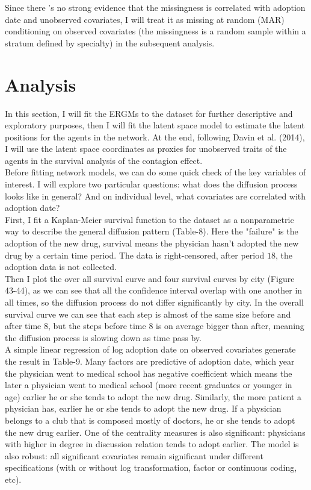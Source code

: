 \documentclass[11pt]{article}
\begin{document}
Since there 's no strong evidence that the missingness is correlated with adoption date and unobserved covariates, I will treat it as missing at random (MAR) conditioning on observed covariates (the missingness is a random sample within a stratum defined by specialty) in the subsequent analysis.\\


\section{Analysis}
In this section, I will fit the ERGMs to the dataset for further descriptive and exploratory purposes, then I will fit the latent space model to estimate the latent positions for the agents in the network. At the end, following Davin et al. (2014), I will use the latent space coordinates as proxies for unobserved traits of the agents in the survival analysis of the contagion effect.\\

Before fitting network models, we can do some quick check of the key variables of interest. I will explore two particular questions: what does the diffusion process looks like in general? And on individual level, what covariates are correlated with adoption date?\\

First, I fit a Kaplan-Meier survival function to the dataset as a nonparametric way to describe the general diffusion pattern (Table-8). Here the "failure" is the adoption of the new drug, survival means the physician hasn't adopted the new drug by a certain time period. The data is right-censored, after period $18$, the adoption data is not collected. \\

Then I plot the over all survival curve and four survival curves by city (Figure 43-44), as we can see that all the confidence interval overlap with one another in all times, so the diffusion process do not differ significantly by city. In the overall survival curve we can see that each step is almost of the same size before and after time $8$, but the steps before time $8$ is on average bigger than after, meaning the diffusion process is slowing down as time pass by.\\

A simple linear regression of log adoption date on observed covariates generate the result in Table-9. Many factors are predictive of adoption date, which year the physician went to medical school has negative coefficient which means the later a physician went to medical school (more recent graduates or younger in age) earlier he or she tends to adopt the new drug. Similarly, the more patient a physician has, earlier he or she tends to adopt the new drug. If a physician belongs to a club that is composed mostly of doctors, he or she tends to adopt the new drug earlier. One of the centrality measures is also significant: physicians with higher in degree in discussion relation tends to adopt earlier. The model is also robust: all significant covariates remain significant under different specifications (with or without log transformation, factor or continuous coding, etc). \\
\end{document}
